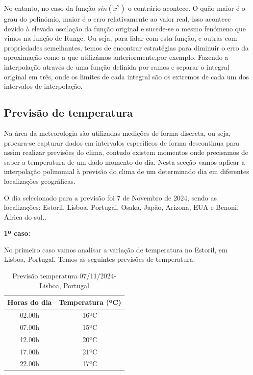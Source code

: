 \documentclass[12pt]{article}
\begin{document}
\hspace{0.5cm}No entanto, no caso da função $sin(x^2)$ o contrário acontece. O quão maior é o grau do polinómio, maior é o erro relativamente ao valor real. Isso acontece devido à elevada oscilação da função original e sucede-se o mesmo fenómeno que vimos na função de Runge. Ou seja, para lidar com esta função, e outras com propriedades semelhantes, temos de encontrar estratégias para diminuir o erro da aproximação como a que utilizámos anteriormente,por exemplo. Fazendo a interpolação através de uma função definida por ramos e separar o integral original em três, onde os limites de cada integral são os extremos de cada um dos intervalos de interpolação.


\subsection{Previsão de temperatura}

\hspace{0.5cm}Na área da meteorologia são utilizadas medições de forma discreta, ou seja, procura-se capturar dados em intervalos específicos de forma descontinua para assim realizar previsões do clima, contudo existem momentos onde precisamos de saber a temperatura de um dado momento do dia. Nesta secção vamos aplicar a interpolação polinomial à previsão do clima de um determinado dia em diferentes localizações geográficas.

\hspace{0.5cm} O dia selecionado para a previsão foi 7 de Novembro de 2024, sendo as localizações: Estoril, Lisboa, Portugal, Osaka, Japão, Arizona, EUA e Benoni, África do sul..

\hspace{0.5cm}\textbf{1º caso:}

\hspace{0.5cm}No primeiro caso vamos analisar a variação de temperatura no Estoril, em Lisboa, Portugal. Temos as seguintes previsões de temperatura:

\begin{table}[H]
    \centering
    \begin{tabular}{|c|c|}
        \hline
        \textbf{Horas do dia} & \textbf{Temperatura (ºC)} \\
        \hline
        02.00h & 16ºC \\
        \hline
        07.00h & 15ºC \\
        \hline
        12.00h & 20ºC \\
        \hline
        17.00h & 21ºC \\
        \hline
        22.00h & 17ºC \\
        \hline
    \end{tabular}
    \caption{Previsão temperatura 07/11/2024- Lisboa, Portugal\cite{estorilWeather24}}
\end{table}
\end{document}
